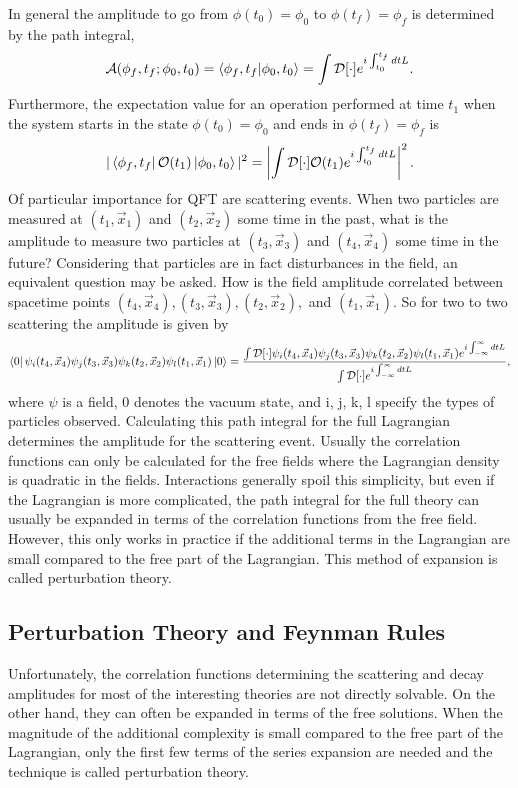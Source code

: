 In general the amplitude to go from $\phi(t_0) = \phi_0$ to $\phi(t_f) = \phi_f$ is determined by the path integral, 
\begin{equation}
\mathcal{A}(\phi_f, t_f; \phi_0, t_0) = \braket{\phi_f,t_f|\phi_0,t_0} = \int \mathcal{D}[\cdot] e^{i\int_{t_0}^{t_f} dt L}.
\end{equation}
Furthermore, the expectation value for an operation performed at time $t_1$ when the system starts in the state $\phi(t_0) = \phi_0$ and ends in $\phi(t_f) = \phi_f$ is
\begin{equation}
|\bra{\phi_f,t_f}\mathcal{O}(t_1)\ket{\phi_0,t_0}|^2 = \left|\int \mathcal{D}[\cdot] \mathcal{O}(t_1) e^{i\int_{t_0}^{t_f} dt L}\right|^2.
\end{equation}
Of particular importance for QFT are scattering events. When two particles are measured at $(t_1,\vec{x}_1)$ and $(t_2,\vec{x}_2)$ some time in the past, what is the amplitude to measure two particles at $(t_3,\vec{x}_3)$ and $(t_4,\vec{x}_4)$ some time in the future? Considering that particles are in fact disturbances in the field, an equivalent question may be asked. How is the field amplitude correlated between spacetime points $(t_4, \vec{x}_4), (t_3, \vec{x}_3), (t_2, \vec{x}_2),$ and $(t_1, \vec{x}_1)$. So for two to two scattering the amplitude is given by
\begin{equation}
\bra{0}\psi_i(t_4,\vec{x}_4)\psi_j(t_3,\vec{x}_3)\psi_k(t_2,\vec{x}_2)\psi_l(t_1,\vec{x}_1)\ket{0} = 
\frac{\int \mathcal{D}[\cdot]\psi_i(t_4,\vec{x}_4)\psi_j(t_3,\vec{x}_3)\psi_k(t_2,\vec{x}_2)\psi_l(t_1,\vec{x}_1)
e^{i\int_{-\infty}^{\infty} dt L}}{\int \mathcal{D}[\cdot]e^{i\int_{-\infty}^{\infty} dt L}},
\end{equation}
where $\psi$ is a field, 0 denotes the vacuum state, and i, j, k, l specify the types of particles observed. Calculating this path integral for the full Lagrangian determines the amplitude for the scattering event. Usually the correlation functions can only be calculated for the free fields where the Lagrangian density is quadratic in the fields. Interactions generally spoil this simplicity, but even if the Lagrangian is more complicated, the path integral for the full theory can usually be expanded in terms of the correlation functions from the free field. However, this only works in practice if the additional terms in the Lagrangian are small compared to the free part of the Lagrangian. This method of expansion is called perturbation theory.     

\subsection{Perturbation Theory and Feynman Rules}
Unfortunately, the correlation functions determining the scattering and decay amplitudes for most of the interesting theories are not directly solvable. On the other hand, they can often be expanded in terms of the free solutions. When the magnitude of the additional complexity is small compared to the free part of the Lagrangian, only the first few terms of the series expansion are needed and the technique is called perturbation theory. 

